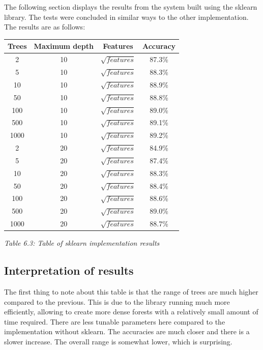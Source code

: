 The following section displays the results from the system built using the sklearn library.
The tests were concluded in similar ways to the other implementation.
The results are as follows:

\begin{center}
\begin{tabular}{| c | c | c | c |}
\hline
Trees & Maximum depth & Features & Accuracy \\
\hline
2 & 10 & $\sqrt{features}$ & 87.3\% \\
\hline
5 & 10 & $\sqrt{features}$ & 88.3\% \\
\hline
10 & 10 & $\sqrt{features}$ & 88.9\% \\
\hline
50 & 10 & $\sqrt{features}$ & 88.8\% \\
\hline
100 & 10 & $\sqrt{features}$ & 89.0\% \\
\hline
500 & 10 & $\sqrt{features}$ & 89.1\% \\
\hline
1000 & 10 & $\sqrt{features}$ & 89.2\% \\

\hline
2 & 20 & $\sqrt{features}$ & 84.9\% \\
\hline
5 & 20 & $\sqrt{features}$ & 87.4\% \\
\hline
10 & 20 & $\sqrt{features}$ & 88.3\% \\
\hline
50 & 20 & $\sqrt{features}$ & 88.4\% \\
\hline
100 & 20 & $\sqrt{features}$ & 88.6\% \\
\hline
500 & 20 & $\sqrt{features}$ & 89.0\% \\
\hline
1000 & 20 & $\sqrt{features}$ & 88.7\% \\
\hline
\end{tabular}

\textit{Table 6.3: Table of sklearn implementation results}
\end{center}


\subsection{Interpretation of results}
The first thing to note about this table is that the range of trees are much higher compared to the previous. This is due to the library running much more efficiently, allowing to create more dense forests with a relatively small amount of time required. There are less tunable parameters here compared to the implementation without sklearn. The accuracies are much closer and there is a slower increase. The overall range is somewhat lower, which is surprising. 

